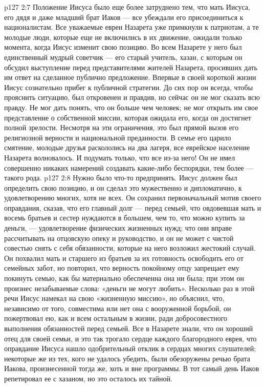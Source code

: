 \vs p127 2:7 Положение Иисуса было еще более затруднено тем, что мать Иисуса, его дядя и даже младший брат Иаков --- все убеждали его присоединиться к националистам. Все уважаемые евреи Назарета уже примкнули к патриотам, а те молодые люди, которые еще не включились в их движение, ожидали только момента, когда Иисус изменит свою позицию. Во всем Назарете у него был единственный мудрый советчик --- его старый учитель, хазан, с которым он обсудил выступление перед представителями жителей Назарета, просивших дать им ответ на сделанное публично предложение. Впервые в своей короткой жизни Иисус сознательно прибег к публичной стратегии. До сих пор он всегда, чтобы прояснить ситуацию, был откровенен и правдив, но сейчас он не мог сказать всю правду. Не мог дать понять, что он больше чем человек; не мог открыть им свое представление о собственной миссии, которая ожидала его, когда он достигнет полной зрелости. Несмотря на эти ограничения, это был прямой вызов его религиозной верности и национальной преданности. В семье его царило смятение, молодые друзья раскололись на два лагеря, все еврейское население Назарета волновалось. И подумать только, что все из\hyp{}за него! Он не имел совершенно никаких намерений создавать какие\hyp{}либо беспорядки, тем более --- такого рода.
\vs p127 2:8 Нужно было что\hyp{}то предпринять. Иисус должен был определить свою позицию, и он сделал это мужественно и дипломатично, к удовлетворению многих, хотя не всех. Он сохранил первоначальный мотив своего оправдания, сказав, что его главный долг --- перед семьей, что овдовевшая мать и восемь братьев и сестер нуждаются в большем, чем то, что можно купить за деньги, --- удовлетворение физических жизненных нужд; что они вправе рассчитывать на отцовскую опеку и руководство, и он не может с чистой совестью снять с себя обязанности, которые на него возложил жестокий случай. Он похвалил мать и старшего из братьев за их готовность освободить его от семейных забот, но повторил, что верность покойному отцу запрещает ему покинуть семью, как бы материально обеспеченна она ни была; при этом он произнес незабываемые слова: «деньги не могут любить». Несколько раз в этой речи Иисус намекал на свою «жизненную миссию», но объяснил, что, независимо от того, совместима или нет она с вооруженной борьбой, он пожертвовал ею, как и всем остальным в жизни, ради добросовестного выполнения обязанностей перед семьей. Все в Назарете знали, что он хороший отец для своей семьи, и это так трогало сердце каждого благородного еврея, что оправдание Иисуса нашло одобрительный отклик в сердцах многих слушателей; некоторые же из тех, кого не удалось убедить, были обезоружены речью брата Иакова, произнесенной тогда же, хоть и вне программы. В тот самый день Иаков репетировал ее с хазаном, но это осталось их тайной.

